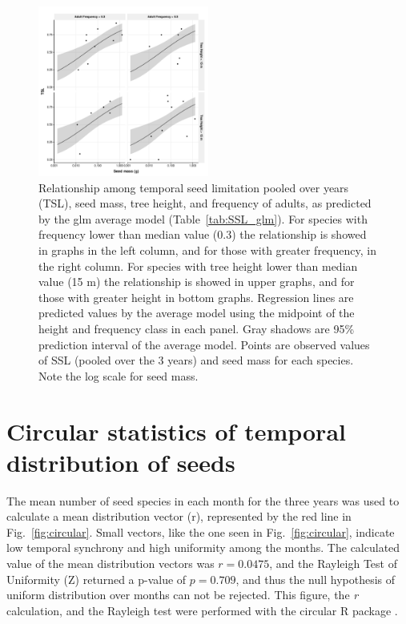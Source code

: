 \documentclass[A4]{article}
\begin{document}
\begin{figure}[h!]
  \centering
  \includegraphics[width=0.5\textwidth]{../figures/TSL_all_pred_prob_glm}
  \caption{Relationship among temporal seed limitation pooled over
    years (TSL), seed mass, tree height, and frequency of adults, as
    predicted by the glm average model (Table~\ref{tab:SSL_glm}). For
    species with frequency lower than median value (0.3) the
    relationship is showed in graphs in the left column, and for those
    with greater frequency, in the right column. For species with tree
    height lower than median value (15 m) the relationship is showed
    in upper graphs, and for those with greater height in bottom
    graphs. Regression lines are predicted values by the average model
    using the midpoint of the height and frequency class in each
    panel. Gray shadows are 95\% prediction interval of the average
    model. Points are observed values of SSL (pooled over the 3 years)
    and seed mass for each species. Note the log scale for seed mass.}
  \label{fig:TSL_glm}
\end{figure}

\FloatBarrier
\section*{Circular statistics of temporal distribution of seeds}
\label{sec:circ-stat-temp}

The mean number of seed species in each month for the three years was
used to calculate a mean distribution vector (r), represented by the
red line in Fig.~\ref{fig:circular}. Small vectors, like the one
seen in Fig.~\ref{fig:circular}, indicate low temporal synchrony and
high uniformity among the months. The calculated value of the mean
distribution vectors was $r=0.0475$, and the Rayleigh Test of
Uniformity (Z) returned a p-value of $p=0.709$, and thus the null
hypothesis of uniform distribution over months can not be
rejected. This figure, the \emph{r} calculation, and the Rayleigh test
were performed with the circular R package \cite{circular}.
\end{document}
